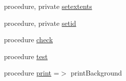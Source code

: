 \begin{DoxyCompactItemize}
\item 
procedure, private \mbox{\hyperlink{structbackground__mod_1_1background__class_a2265e90a0a0685465a17721576919af5}{setextents}}
\item 
procedure, private \mbox{\hyperlink{structbackground__mod_1_1background__class_aa9fde21edbd805c17a6610d9db2ef4a4}{setid}}
\item 
procedure \mbox{\hyperlink{structbackground__mod_1_1background__class_ac6df939097034b1b810ab1e4dca9857a}{check}}
\item 
procedure \mbox{\hyperlink{structbackground__mod_1_1background__class_abe7c9e689ba522cbd15754980ef1cc47}{test}}
\item 
procedure \mbox{\hyperlink{structbackground__mod_1_1background__class_aa1c611fb6813d423cba8f53bdf25465d}{print}} =$>$ print\+Background
\end{DoxyCompactItemize}
